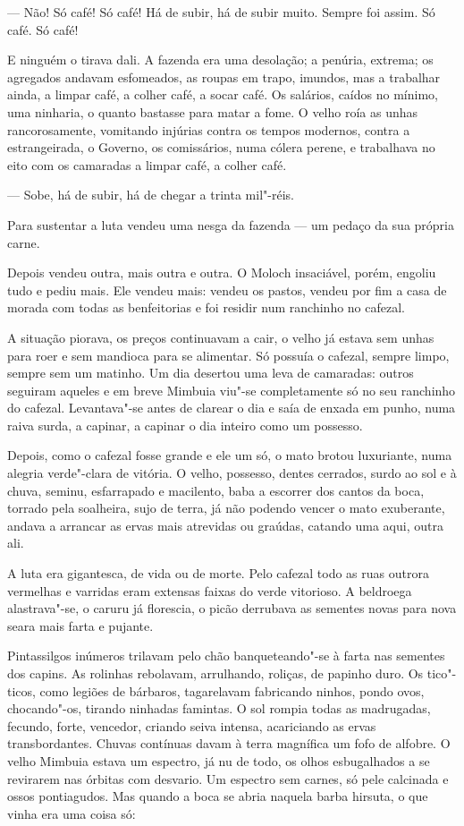 --- Não! Só café! Só café! Há de subir, há de subir muito. Sempre foi
assim. Só café. Só café!

E ninguém o tirava dali. A fazenda era uma desolação; a penúria,
extrema; os agregados andavam esfomeados, as roupas em trapo, imundos,
mas a trabalhar ainda, a limpar café, a colher café, a socar café. Os
salários, caídos no mínimo, uma ninharia, o quanto bastasse para matar a
fome. O velho roía as unhas rancorosamente, vomitando injúrias contra os
tempos modernos, contra a estrangeirada, o Governo, os comissários, numa
cólera perene, e trabalhava no eito com os camaradas a limpar café, a
colher café.

--- Sobe, há de subir, há de chegar a trinta mil"-réis.

Para sustentar a luta vendeu uma nesga da fazenda --- um pedaço da sua
própria carne.

Depois vendeu outra, mais outra e outra. O Moloch insaciável, porém,
engoliu tudo e pediu mais. Ele vendeu mais: vendeu os pastos, vendeu por
fim a casa de morada com todas as benfeitorias e foi residir num
ranchinho no cafezal.

A situação piorava, os preços continuavam a cair, o velho já estava sem
unhas para roer e sem mandioca para se alimentar. Só possuía o cafezal,
sempre limpo, sempre sem um matinho. Um dia desertou uma leva de
camaradas: outros seguiram aqueles e em breve Mimbuia viu"-se
completamente só no seu ranchinho do cafezal. Levantava"-se antes de
clarear o dia e saía de enxada em punho, numa raiva surda, a capinar, a
capinar o dia inteiro como um possesso.

Depois, como o cafezal fosse grande e ele um só, o mato brotou
luxuriante, numa alegria verde"-clara de vitória. O velho, possesso,
dentes cerrados, surdo ao sol e à chuva, seminu, esfarrapado e
macilento, baba a escorrer dos cantos da boca, torrado pela soalheira,
sujo de terra, já não podendo vencer o mato exuberante, andava a
arrancar as ervas mais atrevidas ou graúdas, catando uma aqui, outra
ali.

A luta era gigantesca, de vida ou de morte. Pelo cafezal todo as ruas
outrora vermelhas e varridas eram extensas faixas do verde vitorioso. A
beldroega alastrava"-se, o caruru já florescia, o picão derrubava as
sementes novas para nova seara mais farta e pujante.

Pintassilgos inúmeros trilavam pelo chão banqueteando"-se à farta nas
sementes dos capins. As rolinhas rebolavam, arrulhando, roliças, de
papinho duro. Os tico"-ticos, como legiões de bárbaros, tagarelavam
fabricando ninhos, pondo ovos, chocando"-os, tirando ninhadas famintas. O
sol rompia todas as madrugadas, fecundo, forte, vencedor, criando seiva
intensa, acariciando as ervas transbordantes. Chuvas contínuas davam à
terra magnífica um fofo de alfobre. O velho Mimbuia estava um espectro,
já nu de todo, os olhos esbugalhados a se revirarem nas órbitas com
desvario. Um espectro sem carnes, só pele calcinada e ossos pontiagudos.
Mas quando a boca se abria naquela barba hirsuta, o que vinha era uma
coisa só:

